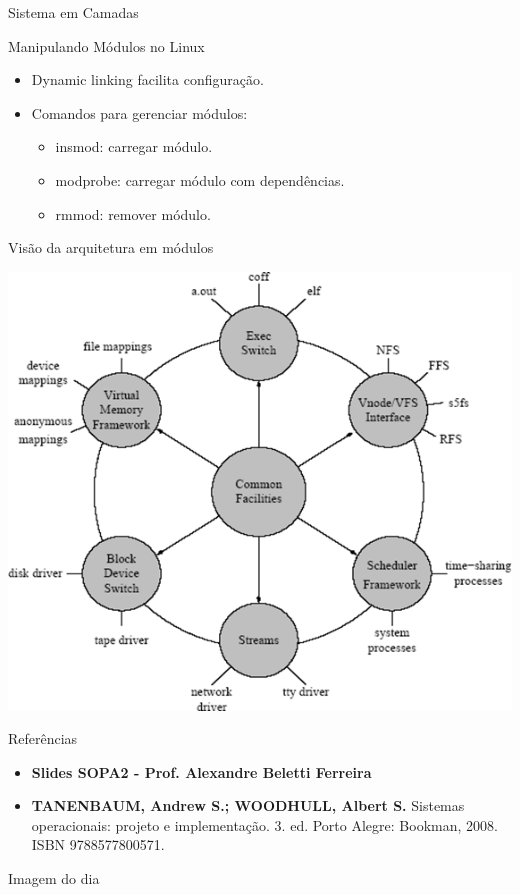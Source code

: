 \documentclass{beamer}
\begin{document}
\begin{frame}{Sistema em Camadas}
\begin{frame}{Manipulando Módulos no Linux}
    \begin{itemize}
        \item Dynamic linking facilita configuração.
        \item Comandos para gerenciar módulos:
            \begin{itemize}
                \item insmod: carregar módulo.
                \item modprobe: carregar módulo com dependências.
                \item rmmod: remover módulo.
            \end{itemize}
    \end{itemize}
\end{frame}
\begin{frame}{Visão da arquitetura em módulos}
    
    \begin{center}
        \includegraphics[width=0.5\linewidth]{assets/aula-tads-sope/SO-unix-linux-4.png}
    \end{center}
\end{frame}




\begin{frame}{Referências }\justifying
    \begin{itemize}
        \item \textbf{Slides SOPA2 - Prof. Alexandre Beletti Ferreira}
        \item \textbf{TANENBAUM, Andrew S.; WOODHULL, Albert S.} Sistemas operacionais: projeto e implementação. 3. ed. Porto Alegre: Bookman, 2008. ISBN 9788577800571.
    \end{itemize}
\end{frame}


\begin{frame}[fragile]{Imagem do dia}


\end{frame}
\end{frame}
\end{document}
